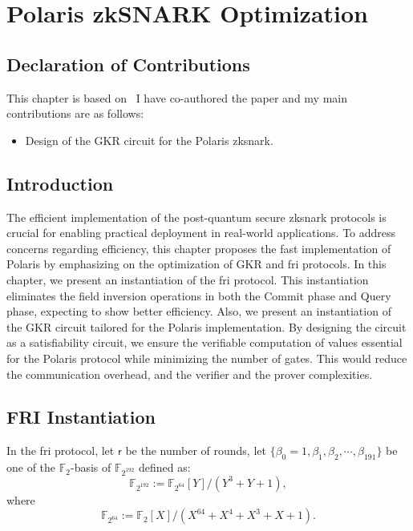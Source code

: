 \chapter{Polaris zkSNARK Optimization}\label{ch:polaris}

\section*{Declaration of Contributions}
This chapter is based on~\cite{Badakhshan2025Ursa} I have co-authored the paper and my main contributions are as follows:
\begin{itemize}
	\item Design of the GKR circuit for the Polaris \gls{zksnark}.
\end{itemize}

\section{Introduction}
The efficient implementation of the  post-quantum secure \gls{zksnark} protocols is crucial for enabling practical deployment in real-world applications. To address concerns regarding efficiency, this chapter proposes the fast implementation of Polaris by emphasizing on the optimization of GKR and \gls{fri} protocols.  In this chapter, we present an instantiation of the \gls{fri} protocol. This instantiation eliminates the field inversion operations in both the Commit phase and Query phase, expecting to show  better efficiency. Also, we present an instantiation of the GKR circuit tailored for the Polaris implementation. By designing the circuit as a  satisfiability circuit, we ensure the verifiable computation of values essential for the Polaris protocol while minimizing the number of gates. This would reduce the communication overhead, and the verifier and the prover complexities.

\section{FRI Instantiation}
\label{sec:FRI_instantiation}

In the \gls{fri} protocol, let $\mathsf{r}$ be the number of rounds, let $\{\beta_0 = 1, \beta_1, \beta_2,\cdots, \beta_{191}\}$ be one of the $\mathbb{F}_2$-basis of $\mathbb{F}_{2^{192}}$ defined as:
\begin{equation}\label{eq_F_2_192}
	\mathbb{F}_{2^{192}} := \mathbb{F}_{2^{64}}[Y]/(Y^3 + Y + 1),
\end{equation}
where
\begin{equation}\label{eq_F_2_64}
	\mathbb{F}_{2^{64}} := \mathbb{F}_{2}[X]/(X^{64} + X^4 + X^3 + X + 1).
\end{equation}
\newline

